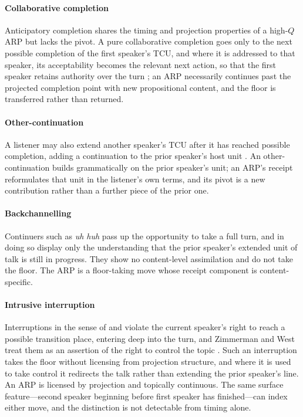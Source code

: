 \paragraph{Collaborative completion} Anticipatory completion \citep{Lerner1991} shares the timing and projection properties of a high-$Q$ ARP but lacks the pivot. A pure collaborative completion goes only to the next possible completion of the first speaker's TCU, and where it is addressed to that speaker, its acceptability becomes the relevant next action, so that the first speaker retains authority over the turn \citep{Lerner2004}; an ARP necessarily continues past the projected completion point with new propositional content, and the floor is transferred rather than returned.

\paragraph{Other-continuation} A listener may also extend another speaker's TCU after it has reached possible completion, adding a continuation to the prior speaker's host unit \citep{Sidnell2012}. An other-continuation builds grammatically on the prior speaker's unit; an ARP's receipt reformulates that unit in the listener's own terms, and its pivot is a new contribution rather than a further piece of the prior one.

\paragraph{Backchannelling} Continuers such as \emph{uh huh} \citep{Schegloff1982} pass up the opportunity to take a full turn, and in doing so display only the understanding that the prior speaker's extended unit of talk is still in progress. They show no content-level assimilation and do not take the floor. The ARP is a floor-taking move whose receipt component is content-specific.

\paragraph{Intrusive interruption} Interruptions in the sense of \citet{ZimmermanWest1975} and \citet{WestZimmerman1983} violate the current speaker's right to reach a possible transition place, entering deep into the turn, and Zimmerman and West treat them as an assertion of the right to control the topic \citep[p.~124]{ZimmermanWest1975}. Such an interruption takes the floor without licensing from projection structure, and where it is used to take control it redirects the talk rather than extending the prior speaker's line. An ARP is licensed by projection and topically continuous. The same surface feature---second speaker beginning before first speaker has finished---can index either move, and the distinction is not detectable from timing alone.

